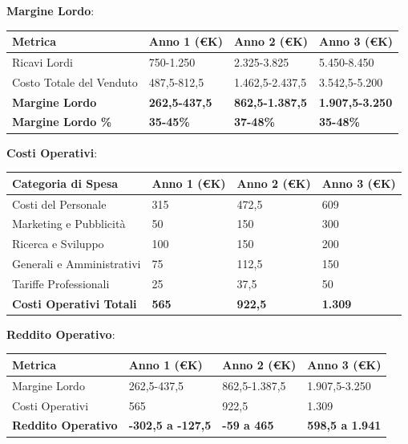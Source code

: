 \documentclass[11pt,a4paper]{report}
\begin{document}
\textbf{Margine Lordo}:

\begin{longtable}{|p{2cm}|p{2cm}|p{2cm}|p{2cm}|}
\hline
\textbf{Metrica} & \textbf{Anno 1 (€K)} & \textbf{Anno 2 (€K)} & \textbf{Anno 3 (€K)} \\ \hline
Ricavi Lordi & 750-1.250 & 2.325-3.825 & 5.450-8.450 \\ \hline
Costo Totale del Venduto & 487,5-812,5 & 1.462,5-2.437,5 & 3.542,5-5.200 \\ \hline
\textbf{Margine Lordo} & \textbf{262,5-437,5} & \textbf{862,5-1.387,5} & \textbf{1.907,5-3.250} \\ \hline
\textbf{Margine Lordo \%} & \textbf{35-45\%} & \textbf{37-48\%} & \textbf{35-48\%} \\ \hline
\end{longtable}

\textbf{Costi Operativi}:

\begin{longtable}{|p{3.5cm}|p{2cm}|p{2cm}|p{2cm}|}
\hline
\textbf{Categoria di Spesa} & \textbf{Anno 1 (€K)} & \textbf{Anno 2 (€K)} & \textbf{Anno 3 (€K)} \\ \hline
Costi del Personale & 315 & 472,5 & 609 \\ \hline
Marketing e Pubblicità & 50 & 150 & 300 \\ \hline
Ricerca e Sviluppo & 100 & 150 & 200 \\ \hline
Generali e Amministrativi & 75 & 112,5 & 150 \\ \hline
Tariffe Professionali & 25 & 37,5 & 50 \\ \hline
\textbf{Costi Operativi Totali} & \textbf{565} & \textbf{922,5} & \textbf{1.309} \\ \hline
\end{longtable}

\textbf{Reddito Operativo}:

\begin{longtable}{|p{2cm}|p{2cm}|p{2cm}|p{2cm}|}
\hline
\textbf{Metrica} & \textbf{Anno 1 (€K)} & \textbf{Anno 2 (€K)} & \textbf{Anno 3 (€K)} \\ \hline
Margine Lordo & 262,5-437,5 & 862,5-1.387,5 & 1.907,5-3.250 \\ \hline
Costi Operativi & 565 & 922,5 & 1.309 \\ \hline
\textbf{Reddito Operativo} & \textbf{-302,5 a -127,5} & \textbf{-59 a 465} & \textbf{598,5 a 1.941} \\ \hline
\end{longtable}
\end{document}
